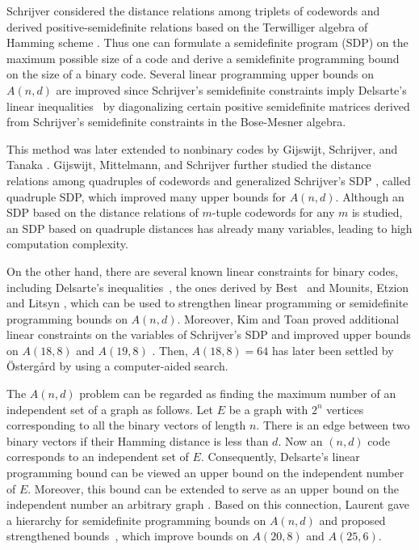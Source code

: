 \documentclass[final,onecolumn]{IEEEtran}
\theoremstyle{definition}
\begin{document}
Schrijver considered the distance relations among triplets of codewords and derived positive-semidefinite relations based on the Terwilliger algebra of Hamming scheme \cite{Sch05}. Thus one can formulate a semidefinite program (SDP) on the maximum possible size of a code and derive a semidefinite programming bound on the size of a binary code. Several linear programming upper bounds on $A(n,d)$ are improved since Schrijver's semidefinite constraints imply Delsarte's linear inequalities~\cite{Sch05} by diagonalizing certain positive semidefinite matrices derived from Schrijver's semidefinite constraints in the Bose-Mesner algebra.

This method was later extended  to nonbinary codes by Gijswijt, Schrijver, and Tanaka \cite{GST06}. Gijswijt, Mittelmann, and Schrijver further studied  the distance relations among quadruples of codewords and generalized Schrijver's SDP \cite{GMS12}, called quadruple SDP, which improved many upper bounds for $A(n,d)$. Although an SDP based on the distance relations of $m$-tuple codewords for any $m$ is studied, an SDP based on quadruple distances has already many variables, leading to high computation complexity.
 
On the other hand, there are several known linear constraints for binary codes, including Delsarte's  inequalities~\cite{Del73},   the ones derived by Best~\cite{Bes80} and Mounits, Etzion and Litsyn \cite{MEL02}, which can be used to strengthen linear programming or semidefinite programming bounds on $A(n,d)$. Moreover, Kim and Toan proved additional linear constraints on the variables of Schrijver's SDP  and improved upper bounds on $A(18, 8)$ and $A(19, 8)$ \cite{KT13}. Then, $A(18, 8) = 64$ has later been settled by {\"O}sterg{\aa}rd \cite{Ost19} by using a computer-aided search.

The $A(n,d)$ problem can be regarded as finding the maximum number of an independent set of a graph as follows. Let $E$ be a graph with $2^n$ vertices corresponding to all the binary vectors of length $n$. There is an edge between two binary vectors if their Hamming distance is less than $d$. Now an $(n,d)$ code corresponds to an independent set of $E$. Consequently, Delsarte's linear programming bound can be viewed an upper bound on the independent number of $E$. Moreover, this bound can be extended to serve as an upper bound on the independent number an arbitrary graph \cite{Sch79}. Based on this connection, Laurent  gave a hierarchy for semidefinite programming bounds on $A(n, d)$  and  proposed strengthened bounds~\cite{Lau07}, which improve bounds on $A(20, 8)$ and $A(25, 6)$. 
\end{document}
